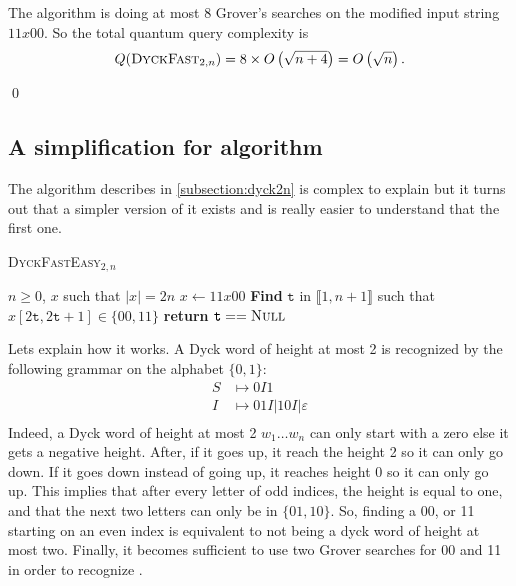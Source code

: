 \begin{tproof}
    The algorithm is doing at most 8 Grover's searches on the modified input
    string $11x00$. So the total quantum query complexity is
    \[Q(\textsc{DyckFast}_{2, n}) = 8\times O\left(\sqrt{n+4}\right) = O\left(\sqrt{n}\right).\]

    \qed
\end{tproof}

\subsection{A simplification for  algorithm}

The algorithm describes in \autoref{subsection:dyck2n} is complex to explain
but it turns out that a simpler version of it exists and is really easier to
understand that the first one.

\begin{algorithm}
    \caption{\textsc{DyckFastEasy}$_{2,n}$}\label{alg:dyck2nsqrteasy}
    \begin{algorithmic}
        \Require $n \geq 0$, $x$ such that  $|x| = 2n$
        \State $x \gets 11x00$
        \State \textbf{Find} $\texttt{t}$ in $\llbracket1, n+1\rrbracket$ such that \\
        \hspace*{1cm} $x[2\texttt{t}, 2\texttt{t}+1] \in \{00, 11\}$
        \State \textbf{return} $\texttt{t} == \textsc{Null}$
    \end{algorithmic}
\end{algorithm}

Lets explain how it works. A Dyck word of height at most 2 is recognized by
the following grammar on the alphabet $\{0, 1\}$:
\begin{align*}
    S & \mapsto 0I1                             \\
    I & \mapsto 01I \vert 10I \vert \varepsilon \\
\end{align*}
Indeed, a Dyck word of height at most 2 $w_1\ldots w_n$ can only start with
a zero else it gets a negative height. After, if it goes up, it reach the
height 2 so it can only go down. If it goes down instead of going up, it
reaches height 0 so it can only go up. This implies that after every letter
of odd indices, the height is equal to one, and that the next
two letters can only be in $\{01, 10\}$. So, finding a 00, or 11 starting
on an even index is equivalent to not being a dyck word of height at most two.
Finally, it becomes sufficient to use two Grover searches for 00 and 11
in order to recognize .

